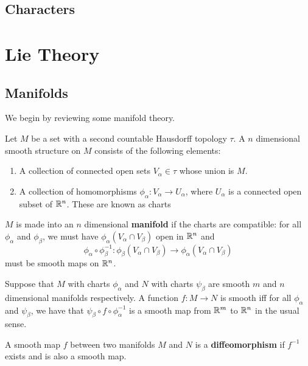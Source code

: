 \documentclass[a4paper]{article}
\begin{document}
\subsection{Characters}

\section{Lie Theory}

\subsection{Manifolds}
We begin by reviewing some manifold theory.

\begin{defi}[Manifold]
    Let $M$ be a set with a second countable Hausdorff topology $\tau$. A $n$ dimensional smooth structure on $M$ consists of the following elements:
    \begin{enumerate}
        \item A collection of connected open sets $V_\alpha \in \tau$ whose union is $M$. 
        \item A collection of homomorphisms $\phi_\alpha : V_\alpha \to U_\alpha$, where $U_\alpha$ is a connected open subset of $\mathbb{R}^n$. These are known as charts
    \end{enumerate}
    $M$ is made into an $n$ dimensional \textbf{manifold} if the charts are compatible: for all $\phi_\alpha$ and $\phi_\beta$, we must have $\phi_\alpha(V_\alpha \cap V_\beta)$ open in $\mathbb{R}^n$ and $$\phi_\alpha \circ  \phi_\beta ^{-1}: \phi_\beta(V_\alpha \cap V_\beta) \to \phi_\alpha(V_\alpha \cap V_\beta)$$ must be smooth maps on $\mathbb{R}^n$.
\end{defi}

\begin{defi}
    Suppose that $M$ with charts $\phi_\alpha$ and $N$ with charts $\psi_\beta$ are smooth $m$ and $n$ dimensional manifolds respectively. A function $f: M \to N$ is smooth iff for all $\phi_\alpha$ and $\psi_\beta$, we have that $\psi_\beta \circ f \circ \phi_\alpha^{-1}$ is a smooth map from $\mathbb{R}^m$ to $\mathbb{R}^n$ in the usual sense.
\end{defi}

\begin{defi}[Diffeomorphism]
    A smooth map $f$ between two manifolds $M$ and $N$ is a \textbf{diffeomorphism} if $f^{-1}$ exists and is also a smooth map.
\end{defi}
\end{document}
